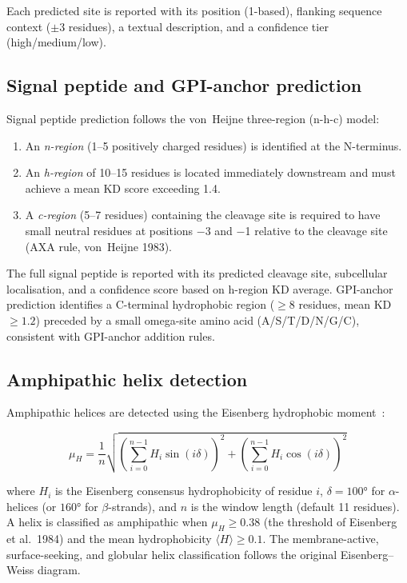 \documentclass[12pt]{article}
\begin{document}
Each predicted site is reported with its position (1-based), flanking sequence
context ($\pm$3 residues), a textual description, and a confidence tier
(high/medium/low).

\subsection{Signal peptide and GPI-anchor prediction}

Signal peptide prediction follows the von~Heijne three-region (n-h-c) model:

\begin{enumerate}[noitemsep]
  \item An \emph{n-region} (1--5 positively charged residues) is identified at
        the N-terminus.
  \item An \emph{h-region} of 10--15 residues is located immediately downstream
        and must achieve a mean KD score exceeding 1.4.
  \item A \emph{c-region} (5--7 residues) containing the cleavage site is
        required to have small neutral residues at positions $-$3 and $-$1
        relative to the cleavage site (AXA rule, von~Heijne 1983).
\end{enumerate}

The full signal peptide is reported with its predicted cleavage site,
subcellular localisation, and a confidence score based on h-region KD average.
GPI-anchor prediction identifies a C-terminal hydrophobic region ($\geq$8
residues, mean KD\,$\geq 1.2$) preceded by a small omega-site amino acid
(A/S/T/D/N/G/C), consistent with GPI-anchor addition rules.

\subsection{Amphipathic helix detection}

Amphipathic helices are detected using the Eisenberg hydrophobic
moment~\citep{eisenberg1984}:

\begin{equation}
\mu_H = \frac{1}{n}\sqrt{\left(\sum_{i=0}^{n-1} H_i \sin(i\delta)\right)^2
                        + \left(\sum_{i=0}^{n-1} H_i \cos(i\delta)\right)^2}
\end{equation}

where $H_i$ is the Eisenberg consensus hydrophobicity of residue $i$,
$\delta = 100°$ for $\alpha$-helices (or $160°$ for $\beta$-strands),
and $n$ is the window length (default 11 residues).
A helix is classified as amphipathic when $\mu_H \geq 0.38$
(the threshold of Eisenberg et al.\ 1984) and the mean hydrophobicity
$\langle H \rangle \geq 0.1$.
The membrane-active, surface-seeking, and globular helix classification
follows the original Eisenberg--Weiss diagram.
\end{document}
